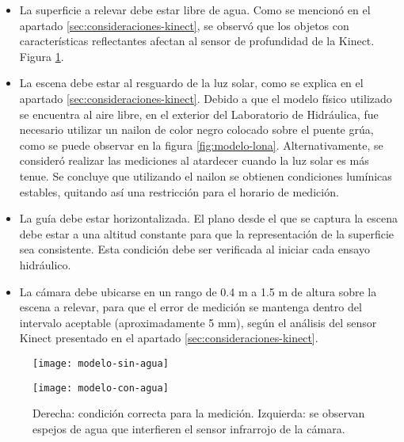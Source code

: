 \begin{itemize}

\item La superficie a relevar debe estar libre de agua. Como se mencionó en el apartado \ref{sec:consideraciones-kinect}, se observó que los objetos con características reflectantes afectan al sensor de profundidad de la Kinect. Figura \ref{fig:modelo-condiciones-agua}.

\item La escena debe estar al resguardo de la luz solar, como se explica en el apartado \ref{sec:consideraciones-kinect}. Debido a que el modelo físico utilizado se encuentra al aire libre, en el exterior del Laboratorio de Hidráulica, fue necesario utilizar un nailon de color negro colocado sobre el puente grúa, como se puede observar en la figura \ref{fig:modelo-lona}. Alternativamente, se consideró realizar las mediciones al atardecer cuando la luz solar es más tenue. Se concluye que utilizando el nailon se obtienen condiciones lumínicas estables, quitando así una restricción para el horario de medición.

\item La guía debe estar horizontalizada. El plano desde el que se captura la escena debe estar a una altitud constante para que la representación de la superficie sea consistente. Esta condición debe ser verificada al iniciar cada ensayo hidráulico.

\item La cámara debe ubicarse en un rango de 0.4 m  a 1.5 m de altura sobre la escena a relevar, para que el error de medición se mantenga dentro del intervalo aceptable (aproximadamente 5 mm), según el análisis del sensor Kinect presentado en el apartado \ref{sec:consideraciones-kinect}.

\end{itemize}

\begin{figure}[ht]
\centering
\begin{minipage}[t]{.45\textwidth}
\begin{center}
\texttt{[image: modelo-sin-agua]} %
\end{center}
\end{minipage}
\hfill
\begin{minipage}[t]{.45\textwidth}
\begin{center}
\texttt{[image: modelo-con-agua]} %
\end{center}
\end{minipage}
\hfill
\caption[Modelo físico con y sin agua sobre la superficie]{Derecha: condición correcta para la medición. Izquierda: se observan espejos de agua que interfieren el sensor infrarrojo de la cámara.}
\label{fig:modelo-condiciones-agua}
\end{figure}

